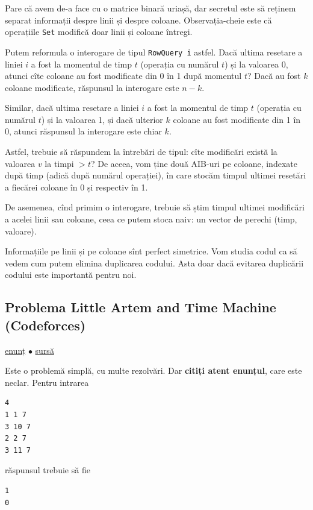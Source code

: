 Pare că avem de-a face cu o matrice binară uriașă, dar secretul este să reținem separat informații despre linii și despre coloane. Observația-cheie este că operațiile \texttt{Set} modifică doar linii și coloane întregi.

Putem reformula o interogare de tipul \texttt{RowQuery i} astfel. Dacă ultima resetare a liniei $i$ a fost la momentul de timp $t$ (operația cu numărul $t$) și la valoarea 0, atunci cîte coloane au fost modificate din 0 în 1 după momentul $t$? Dacă au fost $k$ coloane modificate, răspunsul la interogare este $n-k$.

Similar, dacă ultima resetare a liniei $i$ a fost la momentul de timp $t$ (operația cu numărul $t$) și la valoarea 1, și dacă ulterior $k$ coloane au fost modificate din 1 în 0, atunci răspunsul la interogare este chiar $k$.

Astfel, trebuie să răspundem la întrebări de tipul: cîte modificări există la valoarea $v$ la timpi $> t$? De aceea, vom ține două AIB-uri pe coloane, indexate după timp (adică după numărul operației), în care stocăm timpul ultimei resetări a fiecărei coloane în 0 și respectiv în 1.

De asemenea, cînd primim o interogare, trebuie să știm timpul ultimei modificări a acelei linii sau coloane, ceea ce putem stoca naiv: un vector de perechi (timp, valoare).

Informațiile pe linii și pe coloane sînt perfect simetrice. Vom studia codul ca să vedem cum putem elimina duplicarea codului. Asta doar dacă evitarea duplicării codului este importantă pentru noi. 

\subsection{Problema Little Artem and Time Machine (Codeforces)}
\label{problem:little-artem-and-time-machine}

\href{https://codeforces.com/contest/669/problem/E}{enunț}
$\bullet$
\hyperref[code:little-artem-and-time-machine]{sursă}

Este o problemă simplă, cu multe rezolvări. Dar \textbf{citiți atent enunțul}, care este neclar. Pentru intrarea

\begin{verbatim}
4
1 1 7
3 10 7
2 2 7
3 11 7
\end{verbatim}

răspunsul trebuie să fie

\begin{verbatim}
1
0
\end{verbatim}


